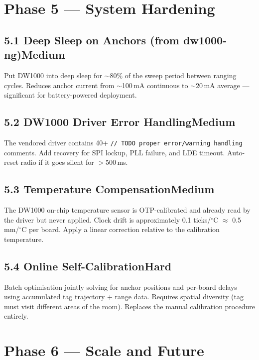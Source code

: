 \documentclass[11pt,a4paper]{article}
\newcommand{\dif}[1]{\texorpdfstring{\hfill#1}{}}
\newcommand{\medium}{\textcolor{dkorange}{\textbf{Medium}}}
\newcommand{\hard}{\textcolor{dkred}{\textbf{Hard}}}
\begin{document}
\section{Phase 5 --- System Hardening}

\subsection{5.1 Deep Sleep on Anchors (from dw1000-ng)\dif{\medium}}
Put DW1000 into deep sleep for $\sim$80\% of the sweep period between ranging cycles. Reduces anchor current from $\sim$100\,mA continuous to $\sim$20\,mA average --- significant for battery-powered deployment.

\subsection{5.2 DW1000 Driver Error Handling\dif{\medium}}
The vendored driver contains 40+ \texttt{// TODO proper error/warning handling} comments. Add recovery for SPI lockup, PLL failure, and LDE timeout. Auto-reset radio if it goes silent for $>$500\,ms.

\subsection{5.3 Temperature Compensation\dif{\medium}}
The DW1000 on-chip temperature sensor is OTP-calibrated and already read by the driver but never applied. Clock drift is approximately 0.1 ticks/$^\circ$C $\approx$ 0.5\,mm/$^\circ$C per board. Apply a linear correction relative to the calibration temperature.

\subsection{5.4 Online Self-Calibration\dif{\hard}}
Batch optimisation jointly solving for anchor positions and per-board delays using accumulated tag trajectory + range data. Requires spatial diversity (tag must visit different areas of the room). Replaces the manual calibration procedure entirely.

\section{Phase 6 --- Scale and Future}
\end{document}

